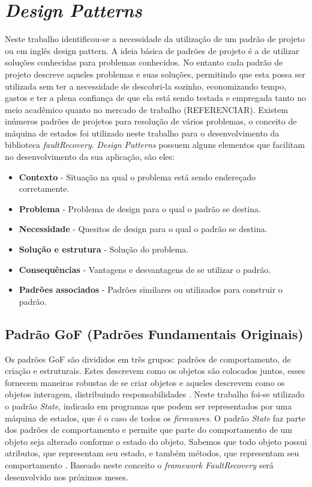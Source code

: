 \section{\textit{Design Patterns}} \label{sec:designPattern}				
Neste trabalho identificou-se a necessidade da utilização de um padrão de projeto ou em inglês design pattern. A ideia básica de padrões de projeto é a de utilizar soluções conhecidas para problemas conhecidos. No entanto cada padrão de projeto descreve aqueles problemas e suas soluções, permitindo que esta possa ser utilizada sem ter a necessidade de descobri-la sozinho, economizando tempo, gastos e ter a plena confiança de que ela está sendo testada e empregada tanto no meio acadêmico quanto no mercado de trabalho (REFERENCIAR). Existem inúmeros padrões de projetos para resolução de vários problemas, o conceito de máquina de estados foi utilizado neste trabalho \cite{Engholm:2010} para o desenvolvimento da biblioteca \textit{faultRecovery}. \textit{Design Patterns} possuem alguns elementos que facilitam no desenvolvimento da sua aplicação, são eles:

\begin{itemize}
	\item \textbf{Contexto} - Situação na qual o problema está sendo endereçado corretamente.
	
	\item \textbf{Problema} - Problema de design para o qual o padrão se destina.
	
	\item \textbf{Necessidade} - Quesitos de design para o qual o padrão se destina.
	
	\item \textbf{Solução e estrutura} - Solução do problema.
	
	\item \textbf{Consequências} - Vantagens e desvantagens de se utilizar o padrão.
	
	\item \textbf{Padrões associados} - Padrões similares ou utilizados para construir o padrão.
\end{itemize}			  


\subsection{Padrão GoF (Padrões Fundamentais Originais)} \label{subsec:gof}
Os padrões GoF são divididos em três grupos: padrões de comportamento, de criação e estruturais. Estes descrevem como os objetos são colocados juntos, esses fornecem maneiras robustas de se criar objetos e aqueles descrevem como os objetos interagem, distribuindo responsabilidades \cite{Engholm:2010}. Neste trabalho foi-se utilizado o padrão \textit{State}, indicado em programas que podem ser representados por uma máquina de estados, que é o caso de todos os \textit{firmwares}. O padrão \textit{State} faz parte dos padrões de comportamento e permite que parte do comportamento de um objeto seja alterado conforme o estado do objeto. Sabemos que todo objeto possui atributos, que representam seu estado, e também métodos, que representam seu comportamento \cite{Vinicius:2009}. Baseado neste conceito o \textit{framework FaultRecovery} será desenvolvido nos próximos meses.